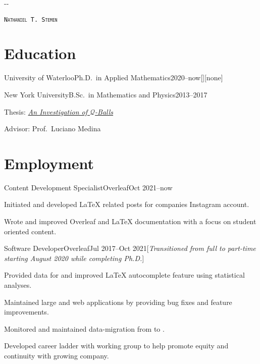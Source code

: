 \documentclass{cultvoucher}
\begin{document}
\begin{adjustwidth}{\dimexpr-\marginparsep-\marginparwidth}{}
	\begin{center}
		\textsc{\texttt{\HUGE Nathaniel T. Stemen}}

		 \separator{} 
	\end{center}
\end{adjustwidth}

\section{Education}

\begin{entry}{University of Waterloo}{Ph.D.\ in Applied Mathematics}{2020--now}[][none]
\end{entry}

\begin{entry}{New York University}{B.Sc.\ in Mathematics and Physics}{2013--2017}
	\item Thesis: \href{https://natestemen.xyz/qv-thesis.pdf}{\textit{An Investigation of $\mathcal{Q}$-Balls}}
	\item Advisor: Prof.\ Luciano Medina
\end{entry}

\section{Employment}
\begin{entry}{Content Development Specialist}{Overleaf}{Oct 2021--now}
	\item Initiated and developed \LaTeX{} related posts for companies Instagram account.
	\item Wrote and improved Overleaf and \LaTeX{} documentation with a focus on student oriented content.
\end{entry}

\begin{entry}{Software Developer}{Overleaf}{Jul 2017--Oct 2021}[\emph{Transitioned from full to part-time starting August 2020 while completing Ph.D.}]
	\item Provided data for and improved \LaTeX{} autocomplete feature using statistical analyses.
	\item Maintained large  and  web applications by providing bug fixes and feature improvements.
	\item Monitored and maintained data-migration from  to .
	\item Developed career ladder with working group to help promote equity and continuity with growing company.
\end{entry}
\end{document}
